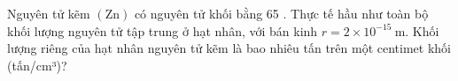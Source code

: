 \begin{btex}[3]
	Nguyên tử kẽm $(\mathrm{Zn})$ có nguyên tử khối bằng 65 . Thực tế hầu như toàn bộ khối lượng nguyên tử tập trung ở hạt nhân, với bán kinh $r=2 \times 10^{-15} \mathrm{~m}$. Khối lượng riêng của hạt nhân nguyên tử kẽm là bao nhiêu tấn trên một centimet khối (tấn/cm³)?
\end{btex}



